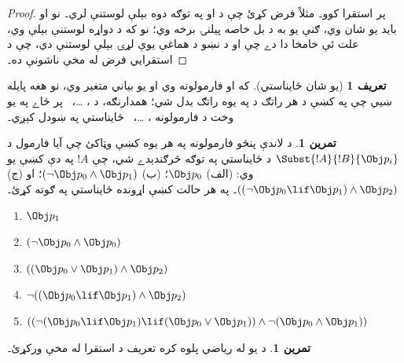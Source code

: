 \documentclass[12pt,a4paper,oneside]{report}
\theoremstyle{definition}
\newtheorem{defn}[thm]{تعريف}
\newtheorem{prob}[thm]{تمرين}
\begin{document}
\label{olpseg:OLP-0059-B020:start}
\begin{proof}
پر  استقرا کوو۔ مثلاً فرض کړئ چې  د  او
 په توګه دوه بېلې لوستنې لري۔ نو  او 
بايد يو شان وي، ګنې يو به د بل خاصه پيلنۍ برخه وي؛ نو که د 
دواړه لوستنې بېلې وي، علت ئې خامخا دا دے چې  او  د نښو د
هماغې يوې لړۍ بېلې لوستنې دي، چې د استقرايي فرض له مخې ناشونې ده۔
\end{proof}
\label{olpseg:OLP-0059-B020:end}

\label{olpseg:OLP-0059-B021:start}
\begin{defn}[يو شان ځايناستي]
که  او  فارمولونه وي او  يو بياني متغير وي، نو  هغه پايله ښيي چې په
 کښې د  هر راتګ د  په يوه راتګ بدل شي؛ همدارنګه،
د ، \dots،~ پر ځاے په يو وخت د فارمولونه
، \dots،~ ځايناستي په
ښودل کېږي۔
\end{defn}
\label{olpseg:OLP-0059-B021:end}

\label{olpseg:OLP-0059-B022:start}
\begin{prob} د لاندې پنځو فارمولونه په هر يوه کښې وټاکئ چې آيا
 فارمول د \( \Subst{!A}{!B}{\Obj p_i} \) د ځايناستي په توګه
 څرګندېدے شي، چې \( !A \) په دې کښې يو وي: (الف) \( \Obj p_0 \)؛
 (ب) \( ( \lnot \Obj p_0 \land \Obj p_1) \)؛ او (ج)
 \( ( ( \lnot \Obj p_0 \lif \Obj p_1 ) \land \Obj p_2 ) \)۔ په هر
 حالت کښې اړونده ځايناستي په ګوته کړئ۔
  \begin{enumerate}
    \item \( \Obj p_1 \) 
    \item \( ( \lnot \Obj p_0 \land \Obj p_0 ) \)
    \item \( ( ( \Obj p_0 \lor \Obj p_1 ) \land \Obj p_2 )  \)
    \item \( \lnot ( ( \Obj p_0 \lif \Obj p_1 ) \land \Obj p_2 ) \)
    \item \( (( \lnot ( \Obj p_0 \lif \Obj p_1 ) \lif ( \Obj p_0 \lor \Obj p_1 )) \land \lnot ( \Obj p_0 \land \Obj p_1 )) \)
  \end{enumerate}
\end{prob}
\label{olpseg:OLP-0059-B022:end}

\label{olpseg:OLP-0059-B023:start}
\begin{prob}
د  يو له رياضي پلوه کره تعريف د استقرا له مخې
ورکړئ۔
\end{prob}
\label{olpseg:OLP-0059-B023:end}
\end{document}
